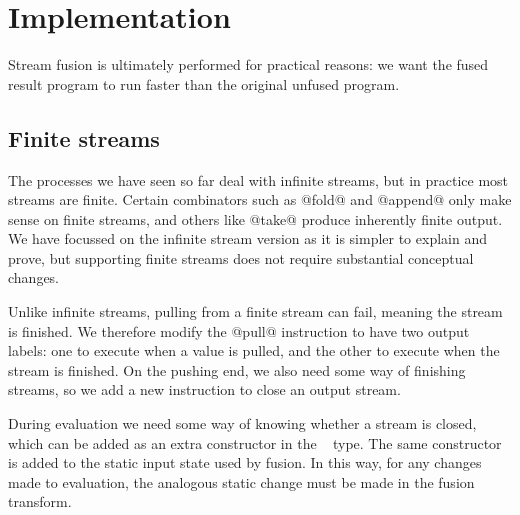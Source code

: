 

\section{Implementation}
\label{s:Evaluation}

Stream fusion is ultimately performed for practical reasons: we want the fused result program to run faster than the original unfused program.

\subsection{Finite streams}
\label{s:Finite}

The processes we have seen so far deal with infinite streams, but in practice most streams are finite. Certain combinators such as @fold@ and @append@ only make sense on finite streams, and others like @take@ produce inherently finite output. We have focussed on the infinite stream version as it is simpler to explain and prove, but supporting finite streams does not require substantial conceptual changes.

Unlike infinite streams, pulling from a finite stream can fail, meaning the stream is finished. We therefore modify the @pull@ instruction to have two output labels: one to execute when a value is pulled, and the other to execute when the stream is finished. On the pushing end, we also need some way of finishing streams, so we add a new instruction to close an output stream.

During evaluation we need some way of knowing whether a stream is closed, which can be added as an extra constructor in the \InputState~ type. The same constructor is added to the static input state used by fusion. In this way, for any changes made to evaluation, the analogous static change must be made in the fusion transform.


